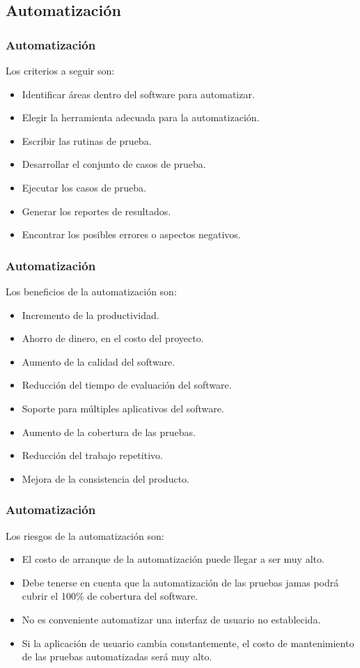 \documentclass{beamer}
\begin{document}
\subsection{Automatización}

\begin{frame}
\frametitle{Automatización}
Los criterios a seguir son:
\begin{itemize}
    \item Identificar áreas dentro del software para automatizar.
    \item Elegir la herramienta adecuada para la automatización.
    \item Escribir las rutinas de prueba.
    \item Desarrollar el conjunto de casos de prueba.
    \item Ejecutar los casos de prueba.
    \item Generar los reportes de resultados.
    \item Encontrar los posibles errores o aspectos negativos.
\end{itemize}
\end{frame}

\begin{frame}
\frametitle{Automatización}
Los beneficios de la automatización son:
\begin{itemize}
    \item Incremento de la productividad.
    \item Ahorro de dinero, en el costo del proyecto.
    \item Aumento de la calidad del software.
    \item Reducción del tiempo de evaluación del software.
    \item Soporte para múltiples aplicativos del software.
    \item Aumento de la cobertura de las pruebas.
    \item Reducción del trabajo repetitivo.
    \item Mejora de la consistencia del producto.
\end{itemize}
\end{frame}

\begin{frame}
\frametitle{Automatización}
Los riesgos de la automatización son:
\begin{itemize}
    \item El costo de arranque de la automatización puede llegar a ser muy alto.
    \item Debe tenerse en cuenta que la automatización de las pruebas jamas
        podrá cubrir el 100\% de cobertura del software.
    \item No es conveniente automatizar una interfaz de usuario no establecida.
    \item Si la aplicación de usuario cambia constantemente, el costo de
        mantenimiento de las pruebas automatizadas será muy alto.
\end{itemize}
\end{frame}
\end{document}
